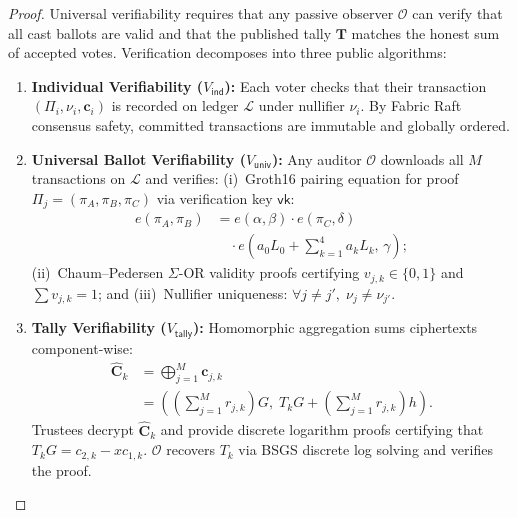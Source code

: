 \documentclass[10pt,letterpaper,journal]{IEEEtran}
\begin{document}
\begin{proof}
Universal verifiability requires that any passive observer $\mathcal{O}$ can verify that all cast ballots are valid and that the published tally $\mathbf{T}$ matches the honest sum of accepted votes. Verification decomposes into three public algorithms:
\begin{enumerate}[leftmargin=*,noitemsep]
  \item \textbf{Individual Verifiability ($V_{\mathsf{ind}}$):} Each voter checks that their transaction $(\Pi_i, \nu_i, \mathbf{c}_i)$ is recorded on ledger $\mathcal{L}$ under nullifier $\nu_i$. By Fabric Raft consensus safety, committed transactions are immutable and globally ordered.
  \item \textbf{Universal Ballot Verifiability ($V_{\mathsf{univ}}$):} Any auditor $\mathcal{O}$ downloads all $M$ transactions on $\mathcal{L}$ and verifies:
  (i)~Groth16 pairing equation for proof $\Pi_j = (\pi_A, \pi_B, \pi_C)$ via verification key $\mathsf{vk}$:
  \begin{equation}
    \label{eq:groth16-verify}
  \begin{aligned}
    e(\pi_A, \pi_B) &= e(\alpha, \beta) \cdot e(\pi_C, \delta) \\
    &\quad \cdot e\left(a_0 L_0 + \sum_{k=1}^4 a_k L_k, \, \gamma\right);
  \end{aligned}
  \end{equation}
  (ii)~Chaum--Pedersen $\Sigma$-OR validity proofs certifying $v_{j,k} \in \{0,1\}$ and $\sum v_{j,k} = 1$; and
  (iii)~Nullifier uniqueness: $\forall j \neq j', \; \nu_j \neq \nu_{j'}$.
  \item \textbf{Tally Verifiability ($V_{\mathsf{tally}}$):} Homomorphic aggregation sums ciphertexts component-wise:
  \begin{equation}
  \begin{aligned}
    \hat{\mathbf{C}}_k &= \bigoplus_{j=1}^M \mathbf{c}_{j,k} \\
    &= \left(\left(\sum_{j=1}^M r_{j,k}\right)G, \; T_k G + \left(\sum_{j=1}^M r_{j,k}\right)h\right).
  \end{aligned}
  \end{equation}
  Trustees decrypt $\hat{\mathbf{C}}_k$ and provide discrete logarithm proofs certifying that $T_k G = c_{2,k} - x c_{1,k}$. $\mathcal{O}$ recovers $T_k$ via BSGS discrete log solving and verifies the proof.
\end{enumerate}
\end{proof}
\end{document}
